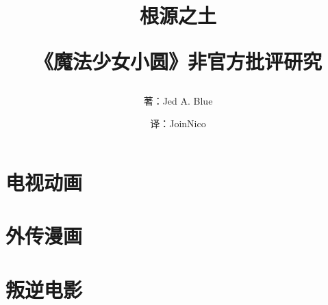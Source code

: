 \documentclass[12pt]{ctexbook}
\title{根源之土

《魔法少女小圆》非官方批评研究}
\author{著：Jed A. Blue \and 译：JoinNico}
\begin{document}
\maketitle
\newpage

\tableofcontents
\newpage

\frontmatter



\mainmatter
\part{电视动画}














\part{外传漫画}





\part{叛逆电影}








\backmatter

\end{document}
